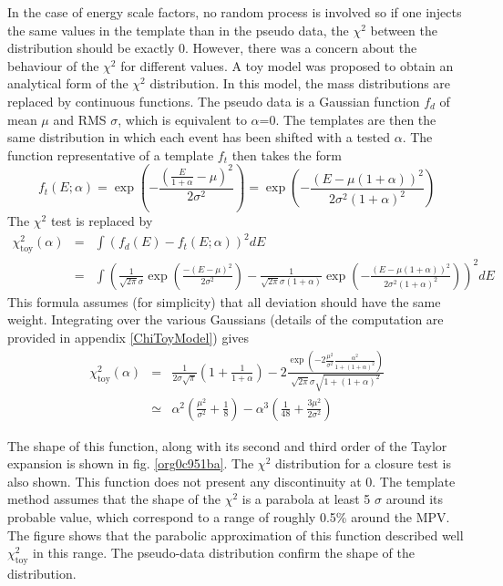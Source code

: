 \begin{enumerate}
In the case of energy scale factors, no random process is involved so if one injects the same values in the template than in the pseudo data, the $\chi^2$ between the distribution should be exactly 0.
However, there was a concern about the behaviour of the $\chi^2$ for different values.
A toy model was proposed to obtain an analytical form of the $\chi^2$ distribution.
In this model, the mass distributions are replaced by continuous functions.
The pseudo data is a Gaussian function \(f_d\) of mean \(\mu\) and RMS \(\sigma\), which is equivalent to \(\alpha\)=0.
The templates are then the same distribution in which each event has been shifted with a tested \(\alpha\).
The function representative of a template \(f_t\)  then takes the form
\begin{equation}
f_t (E; \alpha) =
\exp\left( -\frac{\left(\frac{E}{1+\alpha}-\mu\right)^2}{2\sigma^2}\right)
=
\exp\left( -\frac{(E-\mu(1+\alpha))^2}{2\sigma^2(1+\alpha)^2}\right)
\label{eq:Calibration_scaleShape}
\end{equation}
The $\chi^2$ test is replaced by
\begin{equation}
\begin{array}{lcl}
\chi^2_{\text{toy}}(\alpha) &=& \int ( f_d(E) - f_t(E;\alpha))^2 dE \\
&=& \int ( \frac{1}{\sqrt{2\pi}\sigma}\exp\left( \frac{-(E-\mu)^2}{2\sigma^2} \right) - \frac{1}{\sqrt{2\pi}\sigma (1+\alpha)}\exp\left( -\frac{(E-\mu(1+\alpha))^2}{2\sigma^2(1+\alpha)^2}\right) )^2 dE
\end{array}
\end{equation}
This formula assumes (for simplicity) that all deviation should have the same weight.
Integrating over the various Gaussians (details of the computation are provided in appendix \ref{ChiToyModel}) gives
\begin{equation}
\begin{array}{lcl}
\chi^2_{\text{toy}}(\alpha) &=& \frac{1}{2\sigma\sqrt{\pi}}(1 + \frac{1}{1+\alpha} ) -2   \frac{\exp\left(-2 \frac{\mu^2}{\sigma^2} \frac{\alpha^2}{1+(1+\alpha)^2}\right)}{\sqrt{2\pi}\sigma\sqrt{1+(1+\alpha)^2}}  \\
&\simeq & \alpha^2( \frac{\mu^2}{\sigma^2} + \frac{1}{8}) - \alpha^3 ( \frac{1}{48} + \frac{3\mu^2}{2\sigma^2})
\end{array}
\end{equation}

The shape of this function, along with its second and third order of the Taylor expansion is shown in fig. \ref{org0c951ba}.
The $\chi^2$ distribution for a closure test is also shown.
This function does not present any discontinuity at 0.
The template method assumes that the shape of the $\chi^2$ is a parabola at least 5 \(\sigma\) around its probable value, which correspond to a range of roughly 0.5\% around the MPV.
The figure shows that the parabolic approximation of this function described well \(\chi^{\text{2}}_{\text{toy}}\) in this range.
The pseudo-data distribution confirm the shape of the distribution.


\end{enumerate}
